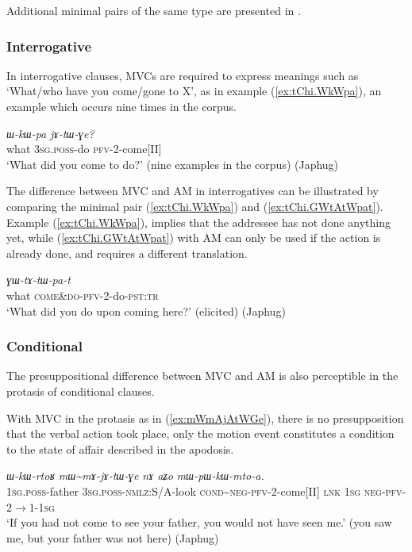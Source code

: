\documentclass[oneside,a4paper,11pt]{article}
\newcommand{\ipa}[1]{{\phon\textit{#1}}}
\newcommand{\redp}{\textasciitilde}
\newcommand{\rouge}[1]{{\color{red}#1}}
\newcommand{\fl}{$\rightarrow$}
\begin{document}
Additional minimal pairs of the same type are presented in \citet[202-203]{jacques13harmonization}.


\subsubsection{Interrogative} \label{sec:am.interrogative}
In interrogative clauses, MVCs are required to express meanings such as `What/who have you come/gone to X', as in example (\ref{ex:tChi.WkWpa}), an example which occurs nine times in the corpus.

\begin{exe}
\ex \label{ex:tChi.WkWpa}
\gll \ipa{tɕʰi}	\ipa{ɯ-kɯ-pa}	\ipa{jɤ-tɯ-ɣe?}\\
what \textsc{3sg.poss}-do \textsc{pfv}-2-come[II] \\
\glt `What did you come to do?' (nine examples in the corpus) (Japhug)
\end{exe}

The difference between MVC and AM in interrogatives can be illustrated by comparing the minimal pair  (\ref{ex:tChi.WkWpa}) and (\ref{ex:tChi.GWtAtWpat}). Example (\ref{ex:tChi.WkWpa}),  implies that the addressee has not done anything yet, while (\ref{ex:tChi.GWtAtWpat}) with AM can only be used if the action is already done, and requires a different translation.

\begin{exe}
\ex \label{ex:tChi.GWtAtWpat}
\gll \ipa{tɕʰi}	\ipa{\rouge{ɣɯ}-tɤ-tɯ-pa-t}  \\
what \rouge{\textsc{come\&do}}-\textsc{pfv}-2-do-\textsc{pst:tr}    \\
\glt `What did you do upon coming here?' (elicited) (Japhug)
\end{exe}

 

\subsubsection{Conditional} \label{sec:am.conditional}
The presuppositional difference between MVC and AM is also perceptible in the protasis of conditional clauses. 

With MVC in the protasis as in (\ref{ex:mWmAjAtWGe}), there is no presupposition that the verbal action took place, only the motion event constitutes a condition to the state of affair described in the apodosis.

\begin{exe}
\ex \label{ex:mWmAjAtWGe}
\gll \ipa{nɤ-wa}	\ipa{ɯ-kɯ-rtoʁ}	\ipa{mɯ\redp{}mɤ-jɤ-tɯ-ɣe}	\ipa{nɤ}	\ipa{aʑo}	\ipa{mɯ-pɯ-kɯ-mto-a.}
 \\
\textsc{1sg.poss}-father \textsc{3sg.poss-}\textsc{nmlz}:S/A-look \textsc{cond}\redp{}\textsc{neg}-\textsc{pfv}-2-come[II] \textsc{lnk} \textsc{1sg} \textsc{neg}-\textsc{pfv}-2\fl{}1-\textsc{1sg} \\
\glt `If you had not come to see your father, you would not have seen me.' (you saw me, but your father was not here) (Japhug)
\end{exe}
\end{document}
